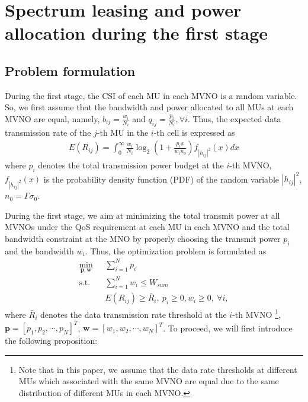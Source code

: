 \documentclass[journal]{IEEEtran}
\begin{document}
\section{Spectrum leasing and power allocation during the first stage}

\subsection{Problem formulation}
During the first stage, the CSI of each MU in each MVNO is a random variable. So, we first assume that the bandwidth and power allocated to all MUs at each MVNO are equal, namely, $b_{ij} = \frac{w_i}{N_i}$ and $q_{ij} = \frac{p_i}{N_i}, \forall i$. Thus, the expected data transmission rate of the $j$-th MU in the $i$-th cell is expressed as
\begin{align}
E\left({R}_{ij}\right) = \int_{0}^{\infty} \frac{w_i}{N_i} \log_2\left(1 + \frac{p_i x}{w_i n_0}\right) f_{\left|h_{ij} \right|^2} \left(x\right)dx
\end{align}
where $p_i$ denotes the total transmission power budget at the $i$-th MVNO, $f_{\left|h_{ij} \right|^2} \left(x\right)$ is the probability density function (PDF) of the random variable $\left|h_{ij} \right|^2$, $n_0 = \Gamma \sigma_0$. 

During the first stage, we aim at minimizing the total transmit power at all MVNOs under the QoS requirement at each MU in each MVNO and the total bandwidth constraint at the MNO by properly choosing the transmit power $p_i$ and the bandwidth $w_i$. Thus, the optimization problem is formulated as
\begin{subequations}\label{q4}
	\begin{align}
	\min_{\mathbf{p}, \mathbf{w}}\ & \sum\limits_{i = 1}^{N} p_i \\ \mbox{s.t.} \quad &  \sum\limits_{i = 1}^{N} w_i \leq W_{sum}\\ \quad &  E\left({R}_{ij}\right) \geq \bar{R}_i, \ p_i \geq 0, w_i \geq 0, \ \forall i, 
	\end{align}
\end{subequations}
where $\bar{R}_i$ denotes the data transmission rate threshold at the $i$-th MVNO  \footnote{Note that in this paper, we assume that the data rate thresholds at different MUs which associated with the same MVNO are equal due to the same distribution of different MUs in each MVNO.}, $\mathbf{p} = \left[p_1, p_2, \cdots, p_N\right]^T$, $\mathbf{w} = \left[w_1, w_2, \cdots, w_N\right]^T$. To proceed, we will first introduce the following proposition:
\end{document}
